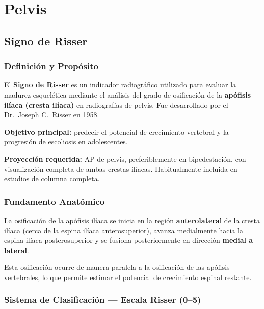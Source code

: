 	
	\section{Pelvis}
	
	\subsection{Signo de Risser}
	
	\subsubsection*{Definición y Propósito}
	
	El \textbf{Signo de Risser} es un indicador radiográfico utilizado para evaluar la madurez
	esquelética mediante el análisis del grado de osificación de la \textbf{apófisis ilíaca
		(cresta ilíaca)} en radiografías de pelvis. Fue desarrollado por el Dr.\ Joseph C.\ Risser
	en 1958.
	
	\textbf{Objetivo principal:} predecir el potencial de crecimiento vertebral y la
	progresión de escoliosis en adolescentes.
	
	\textbf{Proyección requerida:} AP de pelvis, preferiblemente en bipedestación, con
	visualización completa de ambas crestas ilíacas. Habitualmente incluida en estudios
	de columna completa.
	
	\subsubsection*{Fundamento Anatómico}
	
	La osificación de la apófisis ilíaca se inicia en la región \textbf{anterolateral} de
	la cresta ilíaca (cerca de la espina ilíaca anterosuperior), avanza medialmente hacia
	la espina ilíaca posterosuperior y se fusiona posteriormente en dirección
	\textbf{medial a lateral}.
	
	Esta osificación ocurre de manera paralela a la osificación de las apófisis
	vertebrales, lo que permite estimar el potencial de crecimiento espinal restante.
	
	\subsubsection*{Sistema de Clasificación — Escala Risser (0--5)}
	
